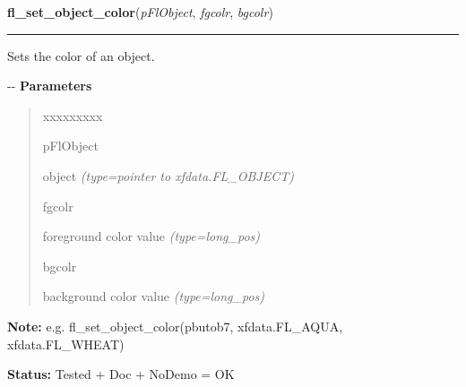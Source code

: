     \vspace{0.5ex}

\hspace{.8\funcindent}\begin{boxedminipage}{\funcwidth}

    \raggedright \textbf{fl\_set\_object\_color}(\textit{pFlObject}, \textit{fgcolr}, \textit{bgcolr})

    \vspace{-1.5ex}

    \rule{\textwidth}{0.5\fboxrule}
\setlength{\parskip}{2ex}

Sets the color of an object.

-{}-
\setlength{\parskip}{1ex}
      \textbf{Parameters}
      \vspace{-1ex}

      \begin{quote}
        \begin{Ventry}{xxxxxxxxx}

          \item[pFlObject]


object
            {\it (type=pointer to xfdata.FL\_OBJECT)}

          \item[fgcolr]


foreground color value
            {\it (type=long\_pos)}

          \item[bgcolr]


background color value
            {\it (type=long\_pos)}

        \end{Ventry}

      \end{quote}

\textbf{Note:} 
e.g. fl\_set\_object\_color(pbutob7, xfdata.FL\_AQUA, xfdata.FL\_WHEAT)


\textbf{Status:} 
Tested + Doc + NoDemo = OK


    \end{boxedminipage}

    \label{xformslib:flbasic:fl_get_object_color}

    \vspace{0.5ex}

